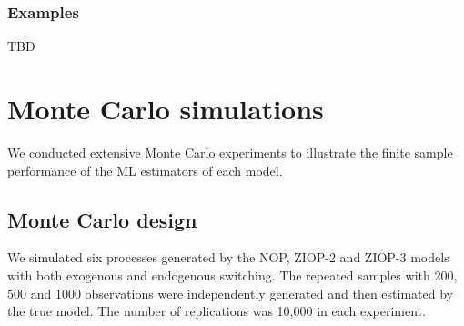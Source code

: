 \documentclass[letterpaper,fleqn,12pt]{article}
\begin{document}
\begin{onehalfspace}
\subsubsection*{Examples}

TBD

\section{Monte Carlo simulations}

We conducted extensive Monte Carlo experiments to illustrate the finite
sample performance of the ML estimators of each model.

\subsection*{Monte Carlo design}

We simulated six processes generated by the NOP, ZIOP-2 and ZIOP-3 models
with both exogenous and endogenous switching. The repeated samples with 200,
500 and 1000 observations were independently generated and then estimated by
the true model. The number of replications was 10,000 in each experiment.


\end{onehalfspace}
\end{document}
